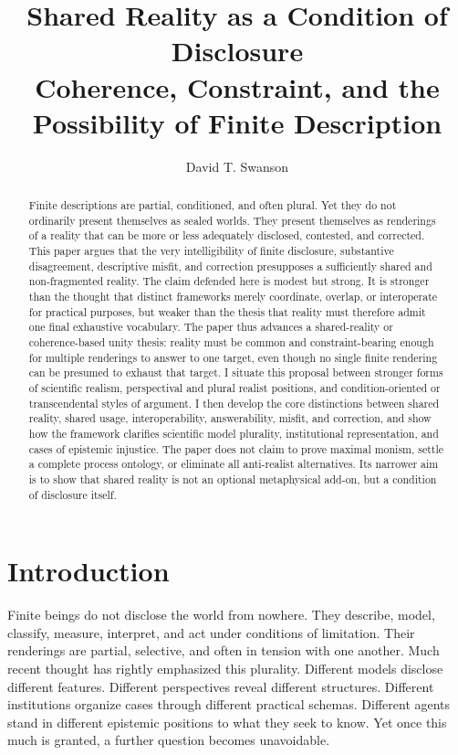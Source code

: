 \documentclass[11pt]{article}
\title{\textbf{Shared Reality as a Condition of Disclosure}\\
\large Coherence, Constraint, and the Possibility of Finite Description}
\author{David T. Swanson}
\date{}
\begin{document}
\maketitle


\begin{abstract}
Finite descriptions are partial, conditioned, and often plural. Yet they do not ordinarily present themselves as sealed worlds. They present themselves as renderings of a reality that can be more or less adequately disclosed, contested, and corrected. This paper argues that the very intelligibility of finite disclosure, substantive disagreement, descriptive misfit, and correction presupposes a sufficiently shared and non-fragmented reality. The claim defended here is modest but strong. It is stronger than the thought that distinct frameworks merely coordinate, overlap, or interoperate for practical purposes, but weaker than the thesis that reality must therefore admit one final exhaustive vocabulary. The paper thus advances a shared-reality or coherence-based unity thesis: reality must be common and constraint-bearing enough for multiple renderings to answer to one target, even though no single finite rendering can be presumed to exhaust that target. I situate this proposal between stronger forms of scientific realism, perspectival and plural realist positions, and condition-oriented or transcendental styles of argument. I then develop the core distinctions between shared reality, shared usage, interoperability, answerability, misfit, and correction, and show how the framework clarifies scientific model plurality, institutional representation, and cases of epistemic injustice. The paper does not claim to prove maximal monism, settle a complete process ontology, or eliminate all anti-realist alternatives. Its narrower aim is to show that shared reality is not an optional metaphysical add-on, but a condition of disclosure itself.
\end{abstract}

\section{Introduction}

Finite beings do not disclose the world from nowhere. They describe, model, classify, measure, interpret, and act under conditions of limitation. Their renderings are partial, selective, and often in tension with one another. Much recent thought has rightly emphasized this plurality. Different models disclose different features. Different perspectives reveal different structures. Different institutions organize cases through different practical schemas. Different agents stand in different epistemic positions to what they seek to know. Yet once this much is granted, a further question becomes unavoidable.
\end{document}
